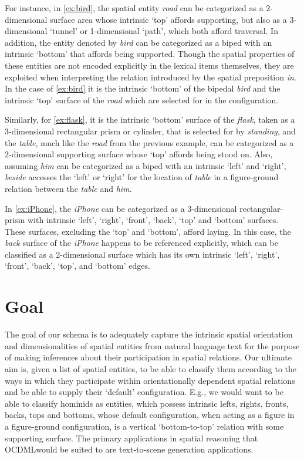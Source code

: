 \documentclass[11pt]{article}
\newcommand{\ML}{OCDML}
\begin{document}
For instance, in \cref{ex:bird}, the spatial entity \emph{road} can be categorized as a 2-dimensional surface area whose intrinsic `top' affords supporting, but also as a 3-dimensional `tunnel' or 1-dimensional `path', which both afford traversal. In addition, the entity denoted by \emph{bird} can be categorized as a biped with an intrinsic `bottom' that affords being supported. Though the spatial properties of these entities are not encoded explicitly in the lexical items themselves, they are exploited when interpreting the relation introduced by the spatial preposition \emph{in}. In the case of \cref{ex:bird} it is the intrinsic `bottom' of the bipedal \emph{bird} and the intrinsic `top' surface of the \emph{road} which are selected for in the configuration. 

Similarly, for \cref{ex:flask}, it is the intrinsic `bottom' surface of the \emph{flask}, taken as a 3-dimensional rectangular prism or cylinder, that is selected for by \emph{standing}, and the \emph{table}, much like the \emph{road} from the previous example, can be categorized as a 2-dimensional supporting surface whose `top' affords being stood on. Also, assuming \emph{him} can be categorized as a biped with an intrinsic `left' and `right', \emph{beside} accesses the `left' or `right' for the location of \emph{table} in a figure-ground relation between the \emph{table} and \emph{him}.

In \cref{ex:iPhone}, the \emph{iPhone} can be categorized as a 3-dimensional rectangular-prism with intrinsic `left', `right', `front', `back', `top' and `bottom' surfaces. These surfaces, excluding the `top' and `bottom', afford laying. In this case, the \emph{back} surface of the \emph{iPhone} happens to be referenced explicitly, which can be classified as a 2-dimensional surface which has its own intrinsic `left', `right', `front', `back', `top', and `bottom' edges.

\section{Goal} %
\label{sec:goal}
The goal of our schema is to adequately capture the intrinsic spatial  orientation and dimensionalities of spatial entities from natural language text for the purpose of making inferences about their participation in spatial relations. Our ultimate aim is, given a list of spatial entities, to be able to classify them according to the ways in which they participate within orientationally dependent spatial relations and be able to supply their `default' configuration. E.g., we would want to be able to classify hominids as entities, which possess intrinsic lefts, rights, fronts, backs, tops and bottoms, whose default configuration, when acting as a figure in a figure-ground configuration, is a vertical `bottom-to-top' relation with some supporting surface. The primary applications in spatial reasoning that \ML would be suited to are text-to-scene generation applications.
\end{document}
